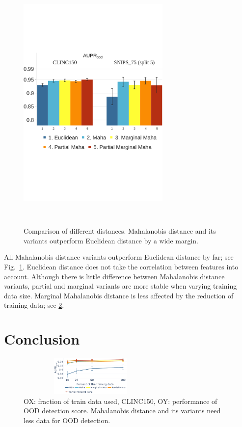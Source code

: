 \documentclass[letterpaper, final]{article} %
\begin{document}
\begin{figure}[ht]
\centering

\begin{subfloat}
\centering\includegraphics[width=7.5cm]{images/roberta_aupr_clinc_snips}
\caption*{}
\end{subfloat}
\leavevmode\\[-8ex]

\caption{Comparison of different distances. Mahalanobis distance and its variants outperform Euclidean distance by a wide margin.}
\label{fig:maha_var_comp}
\end{figure}

All Mahalanobis distance variants outperform Euclidean distance by far; see Fig.~\ref{fig:maha_var_comp}. Euclidean distance does not take the correlation between features into account. Although there is little difference between Mahalanobis distance variants, partial and marginal variants are more stable when varying training data size.  Marginal Mahalanobis distance is less affected by the reduction of training data; see \ref{fig:dataset_size_var}.









\section{Conclusion}
\begin{figure}[t]
\centering
\includegraphics[width=7.2cm, keepaspectratio,height=0.77in ]{aupr_clinc_diff_sizes.pdf}
\caption{OX: fraction of train data used, CLINC150, OY: performance of OOD detection score. Mahalanobis distance and its variants need less data for OOD detection.}
\label{fig:dataset_size_var}
\end{figure}
\end{document}
